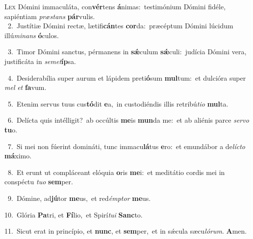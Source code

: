 \lettrine{\initial\textcolor{\initialcolor}{L}}{ex} Dómini immaculáta, con\-\textbf{vér}\-tens \textbf{á}\-nimas:~\star testimónium Dómini fidéle, sapiéntiam \textit{præ}\-\textit{stans} \textbf{pár}\-vulis.\\
{\numbfont\textcolor{\numbcolor}{~2.}}~Justítiæ Dómini rectæ, lætifi\-\textbf{cán}\-tes \textbf{cor}\-da:~\star præcéptum Dómini lúcidum illú\-\textit{mi}\-\textit{nans} \textbf{ó}\-culos.\par
{\numbfont\textcolor{\numbcolor}{~3.}}~Timor Dómini sanctus, pérmanens in \textbf{sǽ}\-culum \textbf{sǽ}\-culi:~\star judícia Dómini vera, justificáta in \textit{se}\-\textit{met}\textbf{íp}sa.\par
{\numbfont\textcolor{\numbcolor}{~4.}}~Desiderabília super aurum et lápidem preti\-\textbf{ó}\-sum \textbf{mul}\-tum:~\star et dulcióra super \textit{mel} \textit{et} \textbf{fa}\-vum.\par
{\numbfont\textcolor{\numbcolor}{~5.}}~Etenim servus tuus cus\-\textbf{tó}\-dit \textbf{e}\-a,~\star in custodiéndis illis retribú\-\textit{ti}\-\textit{o} \textbf{mul}\-ta.\par
{\numbfont\textcolor{\numbcolor}{~6.}}~Delícta quis intélligit?~\dagger ab occúltis \textbf{me}\-is \textbf{mun}\-da me:~\star et ab aliénis parce \textit{ser}\-\textit{vo} \textbf{tu}\-o.\par
{\numbfont\textcolor{\numbcolor}{~7.}}~Si mei non fúerint domináti, tunc immacu\-\textbf{lá}\-tus \textbf{e}\-ro:~\star et emundábor a de\-\textit{líc}\-\textit{to} \textbf{má}\-ximo.\par
{\numbfont\textcolor{\numbcolor}{~8.}}~Et erunt ut compláceant elóquia \textbf{o}\-ris \textbf{me}\-i:~\star et meditátio cordis mei in conspéctu \textit{tu}\-\textit{o} \textbf{sem}\-per.\par
{\numbfont\textcolor{\numbcolor}{~9.}}~Dómine, ad\-\textbf{jú}\-tor \textbf{me}\-us,~\star et red\-\textit{émp}\-\textit{tor} \textbf{me}\-us.\par
{\numbfont\textcolor{\numbcolor}{10.}}~Glória \textbf{Pa}\-tri, et \textbf{Fí}\-lio,~\star et Spirí\-\textit{tu}\-\textit{i} \textbf{Sanc}\-to.\par
{\numbfont\textcolor{\numbcolor}{11.}}~Sicut erat in princípio, et \textbf{nunc}\-, et \textbf{sem}\-per,~\star et in sǽcula sæcu\-\textit{ló}\-\textit{rum}. \textbf{A}\-men.\par
